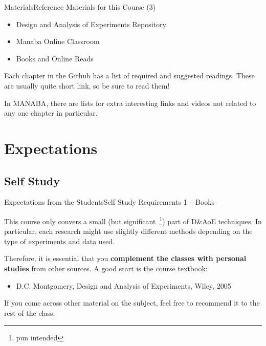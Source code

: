 \documentclass[t]{beamer}
\begin{document}
\begin{ftst}
  {Materials}{Reference Materials for this Course (3)}
  \begin{itemize}
  \item Design and Analysis of Experiments Repository
  \item Manaba Online Classroom
  \item \alert{Books and Online Reads}
  \end{itemize}

  \begin{block}{}
    Each chapter in the Github has a list of required and suggested
    readings. These are usually quite short link, so be sure to read them!

    \vone
    
    In MANABA, there are lists for extra interesting links and videos
    not related to any one chapter in particular.
  \end{block}
\end{ftst}

\section{Expectations}
\subsection{Self Study}

\begin{ftst}
  {Expectations from the Students}{Self Study Requirements 1 -- Books}

  This course only convers a small (but significant~\footnote{pun
    intended}) part of D\&AoE techniques. In particular, each research
  might use slightly different methods depending on the type of
  experiments and data used.

  \vone

  Therefore, it is essential that you {\bf complement the classes with
    personal studies} from other sources. A good start is the course
  textbook:
  
  \vone

  \begin{itemize}
    \item D.C. Montgomery, Design and Analysis of Experiments, Wiley, 2005
  \end{itemize}

  \vone

  If you come across other material on the subject, feel free to
  recommend it to the rest of the class.
\end{ftst}
\end{document}
